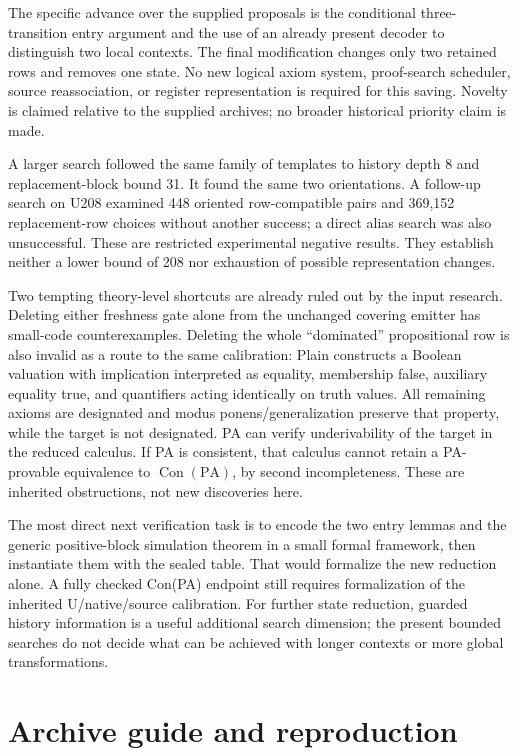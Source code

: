 \documentclass[11pt,letterpaper]{article}
\newcommand{\PA}{\mathrm{PA}}
\newcommand{\Con}{\operatorname{Con}}
\begin{document}
The specific advance over the supplied proposals is the conditional
three-transition entry argument and the use of an already present decoder
to distinguish two local contexts. The final modification changes only
two retained rows and removes one state. No new logical axiom system,
proof-search scheduler, source reassociation, or register representation
is required for this saving. Novelty is claimed relative to the supplied
archives; no broader historical priority claim is made.

A larger search followed the same family of templates to history depth 8
and replacement-block bound 31. It found the same two orientations.
A follow-up search on U208 examined 448 oriented row-compatible pairs
and 369,152 replacement-row choices without another success; a direct
alias search was also unsuccessful. These are restricted experimental
negative results. They establish neither a lower bound of 208 nor
exhaustion of possible representation changes.

Two tempting theory-level shortcuts are already ruled out by the input
research. Deleting either freshness gate alone from the unchanged
covering emitter has small-code counterexamples. Deleting the whole
``dominated'' propositional row is also invalid as a route to the same
calibration: Plain constructs a Boolean valuation with implication
interpreted as equality, membership false, auxiliary equality true,
and quantifiers acting identically on truth values. All remaining
axioms are designated and modus ponens/generalization preserve that
property, while the target is not designated. PA can verify underivability
of the target in the reduced calculus. If PA is consistent, that calculus
cannot retain a PA-provable equivalence to \(\Con(\PA)\), by second
incompleteness. These are inherited obstructions, not new discoveries here.

The most direct next verification task is to encode the two entry lemmas
and the generic positive-block simulation theorem in a small formal
framework, then instantiate them with the sealed table. That would
formalize the new reduction alone. A fully checked Con(PA) endpoint
still requires formalization of the inherited U/native/source calibration.
For further state reduction, guarded history information is a useful
additional search dimension; the present bounded searches do not decide
what can be achieved with longer contexts or more global transformations.

\section{Archive guide and reproduction}
\label{sec:reproduce}
\end{document}
